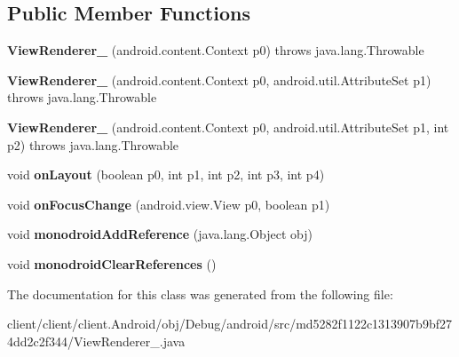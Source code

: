\subsection*{Public Member Functions}
\begin{DoxyCompactItemize}
\item 
\hypertarget{classmd5282f1122c1313907b9bf274dd2c2f344_1_1ViewRenderer__2_a874ec70b71d321d5e90ba30f51fc7f7c}{}{\bfseries View\+Renderer\+\_} (android.\+content.\+Context p0)  throws java.\+lang.\+Throwable 	\label{classmd5282f1122c1313907b9bf274dd2c2f344_1_1ViewRenderer__2_a874ec70b71d321d5e90ba30f51fc7f7c}

\item 
\hypertarget{classmd5282f1122c1313907b9bf274dd2c2f344_1_1ViewRenderer__2_a8794ed1668b41bc6cc99db2f83619919}{}{\bfseries View\+Renderer\+\_} (android.\+content.\+Context p0, android.\+util.\+Attribute\+Set p1)  throws java.\+lang.\+Throwable 	\label{classmd5282f1122c1313907b9bf274dd2c2f344_1_1ViewRenderer__2_a8794ed1668b41bc6cc99db2f83619919}

\item 
\hypertarget{classmd5282f1122c1313907b9bf274dd2c2f344_1_1ViewRenderer__2_a0c074c50a8c373d5547733be4712393c}{}{\bfseries View\+Renderer\+\_} (android.\+content.\+Context p0, android.\+util.\+Attribute\+Set p1, int p2)  throws java.\+lang.\+Throwable 	\label{classmd5282f1122c1313907b9bf274dd2c2f344_1_1ViewRenderer__2_a0c074c50a8c373d5547733be4712393c}

\item 
\hypertarget{classmd5282f1122c1313907b9bf274dd2c2f344_1_1ViewRenderer__2_a859ddde7c3041df74a9131d08cf96a6f}{}void {\bfseries on\+Layout} (boolean p0, int p1, int p2, int p3, int p4)\label{classmd5282f1122c1313907b9bf274dd2c2f344_1_1ViewRenderer__2_a859ddde7c3041df74a9131d08cf96a6f}

\item 
\hypertarget{classmd5282f1122c1313907b9bf274dd2c2f344_1_1ViewRenderer__2_adc3b0ac24770ddc9c1f724275f290d76}{}void {\bfseries on\+Focus\+Change} (android.\+view.\+View p0, boolean p1)\label{classmd5282f1122c1313907b9bf274dd2c2f344_1_1ViewRenderer__2_adc3b0ac24770ddc9c1f724275f290d76}

\item 
\hypertarget{classmd5282f1122c1313907b9bf274dd2c2f344_1_1ViewRenderer__2_a94e673ce425ffaa1efe73a23c5383902}{}void {\bfseries monodroid\+Add\+Reference} (java.\+lang.\+Object obj)\label{classmd5282f1122c1313907b9bf274dd2c2f344_1_1ViewRenderer__2_a94e673ce425ffaa1efe73a23c5383902}

\item 
\hypertarget{classmd5282f1122c1313907b9bf274dd2c2f344_1_1ViewRenderer__2_ab6ea78655d6c6c323eebc6d255558a74}{}void {\bfseries monodroid\+Clear\+References} ()\label{classmd5282f1122c1313907b9bf274dd2c2f344_1_1ViewRenderer__2_ab6ea78655d6c6c323eebc6d255558a74}

\end{DoxyCompactItemize}


The documentation for this class was generated from the following file\+:\begin{DoxyCompactItemize}
\item 
client/client/client.\+Android/obj/\+Debug/android/src/md5282f1122c1313907b9bf274dd2c2f344/View\+Renderer\+\_.\+java\end{DoxyCompactItemize}
